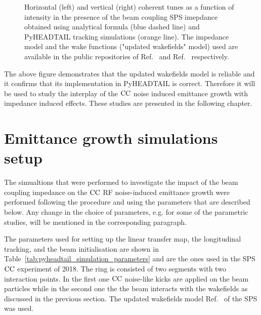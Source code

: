 \begin{figure}[!ht]
\begin{subfigure}[t]{0.45\textwidth}
    \end{subfigure}
    \hfill
     \caption{Horizontal (left) and vertical (right) coherent tunes as a function of intensity in the presence of the beam coupling SPS imepdance obtained using analytical formula (blue dashed line) and PyHEADTAIL tracking simulations (orange line). The impedance model and the wake functions ("updated wakefields" model) used are available in the public repositories of Ref.~\cite{sps_impedance_model_git} and Ref.~\cite{updated_sps_wakfields_model} respectively.} %
     \label{fig:sps_coherent_DQ_vs_intensity_updated_model}
 \end{figure}

 The above figure demonstrates that the updated wakefields model is reliable and it confirms that its implementation in PyHEADTAIL is correct. Therefore it will be used to study the interplay of the ${\mathrm{CC}}$ noise induced emittance growth with impedance induced effects. These studies are presented in the following chapter.


\section{Emittance growth simulations setup}\label{sec:setup_simulations_emit_growth}
The simualtions that were performed to investigate the impact of the beam coupling impedance on the ${\mathrm{CC}}$ RF noise-induced emittance growth were performed following the procedure and using the parameters that are described below. Any change in the choice of parameters, e.g. for some of the parametric studies, will be mentioned in the corresponding paragraph.

The parameters used for setting up the linear transfer map, the longitudinal tracking, and the beam initialisation are shown in Table~\ref{tab:pyheadtail_simulation_parameters} and are the ones used in the SPS ${\mathrm{CC}}$ experiment of 2018. The ring is consisted of two segments with two interaction points. In the first one ${\mathrm{CC}}$ noise-like kicks are applied on the beam particles while in the second one the the beam interacts with the wakefields as discussed in the previous section. The updated wakefields model Ref.~\cite{updated_sps_wakfields_model} of the SPS was used.

